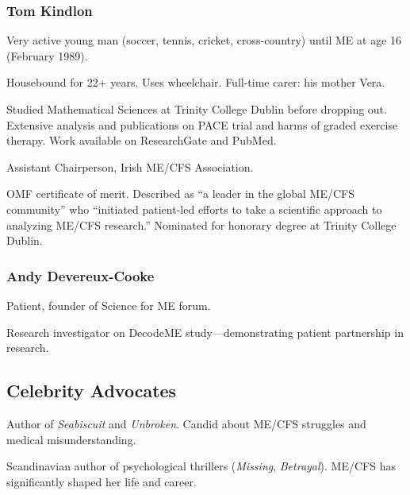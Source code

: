 \subsubsection{Tom Kindlon}
\begin{description}[style=sameline]
\item[Background] Very active young man (soccer, tennis, cricket, cross-country) until ME at age 16 (February 1989).
\item[Current status] Housebound for 22+ years. Uses wheelchair. Full-time carer: his mother Vera.
\item[Expertise] Studied Mathematical Sciences at Trinity College Dublin before dropping out. Extensive analysis and publications on PACE trial and harms of graded exercise therapy. Work available on ResearchGate and PubMed.
\item[Role] Assistant Chairperson, Irish ME/CFS Association.
\item[Recognition] OMF certificate of merit. Described as ``a leader in the global ME/CFS community'' who ``initiated patient-led efforts to take a scientific approach to analyzing ME/CFS research.'' Nominated for honorary degree at Trinity College Dublin.
\end{description}

\subsubsection{Andy Devereux-Cooke}
\begin{description}[style=sameline]
\item[Role] Patient, founder of Science for ME forum.
\item[Research] Research investigator on DecodeME study---demonstrating patient partnership in research.
\end{description}

\subsection{Celebrity Advocates}

\begin{description}[style=nextline]
\item[Laura Hillenbrand] \hfill Author of \textit{Seabiscuit} and \textit{Unbroken}. Candid about ME/CFS struggles and medical misunderstanding.

\item[Karin Alvtegen] \hfill Scandinavian author of psychological thrillers (\textit{Missing}, \textit{Betrayal}). ME/CFS has significantly shaped her life and career.
\end{description}

